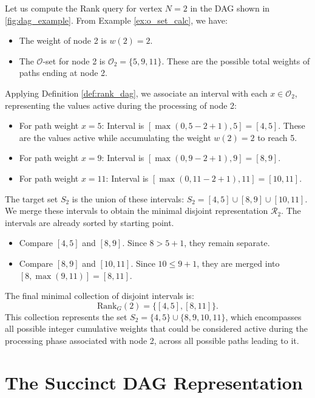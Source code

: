 \begin{example}
    \label{ex:rank_calc_disjoint}
    Let us compute the Rank query for vertex $N=2$ in the DAG shown in \autoref{fig:dag_example}. From Example \ref{ex:o_set_calc}, we have:
    \begin{itemize}
        \item The weight of node 2 is $w(2) = 2$.
        \item The $\mathcal{O}$-set for node 2 is $\mathcal{O}_2 = \{ 5, 9, 11 \}$. These are the possible total weights of paths ending at node 2.
    \end{itemize}
    Applying Definition \ref{def:rank_dag}, we associate an interval with each $x \in \mathcal{O}_2$, representing the values active during the processing of node 2:
    \begin{itemize}
        \item For path weight $x=5$: Interval is $[\max(0, 5 - 2 + 1), 5] = [4, 5]$. These are the values active while accumulating the weight $w(2)=2$ to reach 5.
        \item For path weight $x=9$: Interval is $[\max(0, 9 - 2 + 1), 9] = [8, 9]$.
        \item For path weight $x=11$: Interval is $[\max(0, 11 - 2 + 1), 11] = [10, 11]$.
    \end{itemize}
    The target set $S_2$ is the union of these intervals: $S_2 = [4, 5] \cup [8, 9] \cup [10, 11]$.
    We merge these intervals to obtain the minimal disjoint representation $\mathcal{R}_2$. The intervals are already sorted by starting point.
    \begin{itemize}
        \item Compare $[4, 5]$ and $[8, 9]$. Since $8 > 5 + 1$, they remain separate.
        \item Compare $[8, 9]$ and $[10, 11]$. Since $10 \le 9 + 1$, they are merged into $[8, \max(9, 11)] = [8, 11]$.
    \end{itemize}
    The final minimal collection of disjoint intervals is:
    \[ \mathrm{Rank}_G(2) = \{ [4, 5], [8, 11] \}. \]
    This collection represents the set $S_2 = \{4, 5\} \cup \{8, 9, 10, 11\}$, which encompasses all possible integer cumulative weights that could be considered active during the processing phase associated with node 2, across all possible paths leading to it.
\end{example}
\section{The Succinct DAG Representation}
\label{sec:succinct_dag_representation}

